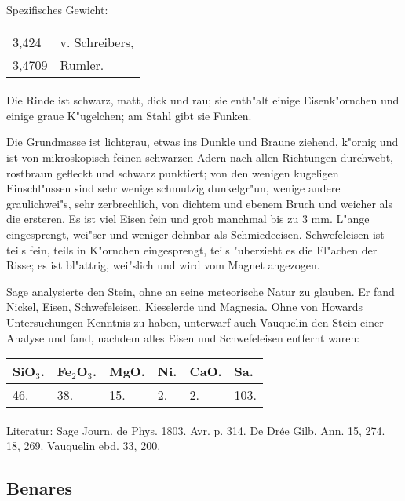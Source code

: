 \documentclass[a4paper, 11pt, oneside]{article}
\begin{document}
Spezifisches Gewicht:
\begin{table}[!ht]
    \centering
    \begin{tabular}{l l}
        3,424 & v. Schreibers,\\
        3,4709 & Rumler.
    \end{tabular}
\end{table}
\paragraph{}
Die Rinde ist schwarz, matt, dick und rau; sie enth"alt einige Eisenk"ornchen und einige graue K"ugelchen; am Stahl gibt sie Funken.

Die Grundmasse ist lichtgrau, etwas ins Dunkle und Braune ziehend, k"ornig und ist von mikroskopisch feinen schwarzen Adern nach allen Richtungen durchwebt, rostbraun gefleckt und schwarz punktiert; von den wenigen kugeligen Einschl"ussen sind sehr wenige schmutzig dunkelgr"un, wenige andere graulichwei"s, sehr zerbrechlich, von dichtem und ebenem Bruch und weicher als die ersteren. Es ist viel Eisen fein und grob manchmal bis zu 3 mm. L"ange eingesprengt, wei"ser und weniger dehnbar als Schmiedeeisen. Schwefeleisen ist teils fein, teils in K"ornchen eingesprengt, teils "uberzieht es die Fl"achen der Risse; es ist bl"attrig, wei"slich und wird vom Magnet angezogen.

Sage analysierte den Stein, ohne an seine meteorische Natur zu glauben. Er fand Nickel, Eisen, Schwefeleisen, Kieselerde und Magnesia. Ohne von Howards Untersuchungen Kenntnis zu haben, unterwarf auch Vauquelin den Stein einer Analyse und fand, nachdem alles Eisen und Schwefeleisen entfernt waren:
\begin{table}[!ht]
    \centering
    \begin{tabular}{l l l l l l}
        SiO$_{3}$. & Fe$_{2}$O$_{3}$. & MgO. & Ni. & CaO. & Sa. \\ \hline
        46. & 38. & 15. & 2. & 2. & 103. \\
    \end{tabular}
\end{table}
\footnotesize
\paragraph{}
Literatur: Sage Journ. de Phys. 1803. Avr. p. 314. De Drée Gilb. Ann. 15, 274. 18, 269. Vauquelin ebd. 33, 200.
\subsection{Benares}
\normalsize
\end{document}
